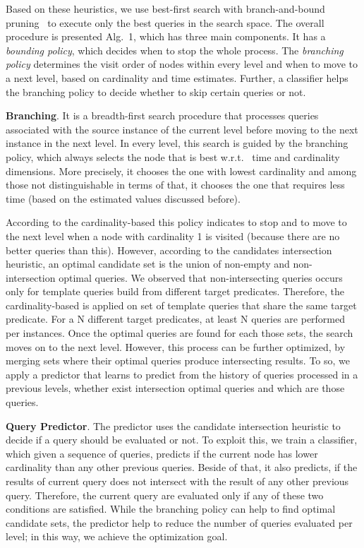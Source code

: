 Based on these heuristics, we use best-first search with branch-and-bound pruning~\cite{DBLP:journals/jacm/DechterP85} to execute only the best queries in the search space. The overall procedure is presented Alg.~1, which has three main components. It has a \emph{bounding policy}, which decides when to stop the whole process. The \emph{branching policy} determines the visit order of nodes within every level and when to move to a next level, based on cardinality and time estimates. Further, a classifier helps the branching policy to decide whether to skip certain queries or not. 

\textbf{Branching}. It is a breadth-first search procedure that processes queries associated with the source instance of the current level before moving to the next instance in the next level. In every level, this search is guided by the branching policy, which always selects the node that is best w.r.t.~ time and cardinality dimensions. More precisely, it chooses the one with lowest cardinality and among those not distinguishable in terms of that, it chooses the one that requires less time (based on the estimated values discussed before). 

According to the cardinality-based  this policy indicates to stop and to move to the next level when a node with cardinality 1 is visited (because there are no better queries than this).  However, according to the candidates intersection heuristic, an optimal candidate set is the union of non-empty and non-intersection optimal queries. We observed that non-intersecting queries occurs only for template queries build from different target predicates. Therefore, the cardinality-based is applied on set of template queries that share the same target predicate. For a N different target predicates, at least N queries are performed per instances. Once the optimal queries are found for each those sets, the search moves on to the next level. However, this process can be further optimized, by merging sets where their optimal queries produce intersecting results. To so, we apply a predictor that learns to predict from the history of queries processed in a previous levels, whether exist intersection optimal queries and which are those queries. 

\textbf{Query Predictor}. 
The predictor uses the candidate intersection heuristic to decide if a query should be evaluated or not. To exploit this, we train a classifier, which given a sequence of queries, predicts if the current node has lower cardinality than any other previous queries. Beside of that, it also predicts, if the results of current query does not intersect with the result of any other previous query. Therefore, the current query are evaluated only if any of these two conditions are satisfied.  While the branching policy can help to find optimal candidate sets, the predictor help to reduce the number of queries evaluated per level; in this way, we achieve the optimization goal.

